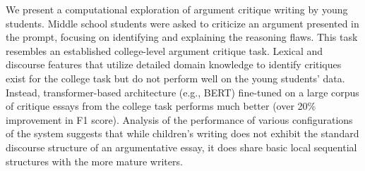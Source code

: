 We present a computational exploration of argument critique writing by young students. Middle school students were asked to criticize an argument presented in the prompt, focusing on identifying and explaining the reasoning flaws. This task resembles an established college-level argument critique task. Lexical and discourse features that utilize detailed domain knowledge to identify critiques exist for the college task but do not perform well on the young students' data. Instead, transformer-based architecture (e.g., BERT) fine-tuned on a large corpus of critique essays from the college task performs much better (over 20\% improvement in F1 score). Analysis of the performance of various configurations of the system suggests that while children's writing does not exhibit the standard discourse structure of an argumentative essay, it does share basic local sequential structures with the more mature writers.
